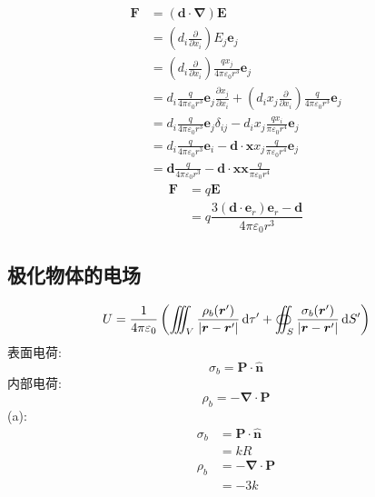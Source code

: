 \begin{align*}
    \boldsymbol{F}&=(\boldsymbol{d}\cdot\boldsymbol{\nabla})\boldsymbol{E}\\
    &=(d_i\frac{\partial}{\partial x_i})E_j\boldsymbol{e}_j\\
    &=(d_i\frac{\partial}{\partial x_i})\frac{qx_j}{4\pi\varepsilon_0r^3}\boldsymbol{e}_j\\
    &=d_i\frac{q}{4\pi\varepsilon_0r^3}\boldsymbol{e}_j\frac{\partial x_j}{\partial x_i}
    +(d_ix_j\frac{\partial}{\partial x_i})\frac{q}{4\pi\varepsilon_0r^3}\boldsymbol{e}_j\\
    &=d_i\frac{q}{4\pi\varepsilon_0r^3}\boldsymbol{e}_j\delta_{ij}
    -d_ix_j\frac{qx_i}{\pi\varepsilon_0r^4}\boldsymbol{e}_j\\
    &=d_i\frac{q}{4\pi\varepsilon_0r^3}\boldsymbol{e}_i
    -\boldsymbol{d}\cdot\boldsymbol{x}x_j\frac{q}{\pi\varepsilon_0r^4}\boldsymbol{e}_j\\
    &=\boldsymbol{d}\frac{q}{4\pi\varepsilon_0r^3}
    -\boldsymbol{d}\cdot\boldsymbol{x}\boldsymbol{x}\frac{q}{\pi\varepsilon_0r^4}
\end{align*}
\begin{align*}
    \boldsymbol{F}&=q\boldsymbol{E}\\
    &=q\dfrac{3(\boldsymbol{d}\cdot\boldsymbol{e}_r)\boldsymbol{e}_r-\boldsymbol{d}}{4\pi\varepsilon_0r^3}
\end{align*}
\subsection{极化物体的电场}
\begin{equation}
    U=\frac{1}{4\pi\varepsilon_0}
\left(
\iiint_V \frac{\rho_b(\boldsymbol r')}{|\boldsymbol r-\boldsymbol r'|}\dif\tau'
+
\oiint_S \frac{\sigma_b(\boldsymbol r')}{|\boldsymbol r-\boldsymbol r'|}\dif S'
\right)
\end{equation}
表面电荷:
\begin{equation}
    \sigma_b=\boldsymbol{P}\cdot\boldsymbol{\hat{n}}
\end{equation}
内部电荷:
\begin{equation}
    \rho_b=-\boldsymbol{\nabla}\cdot\boldsymbol{P}
\end{equation}
(a):
\begin{align*}
    \sigma_b&=\boldsymbol{P}\cdot\boldsymbol{\hat{n}}\\
    &=kR\\
    \rho_b&=-\boldsymbol{\nabla}\cdot\boldsymbol{P}\\
    &=-3k
\end{align*}

